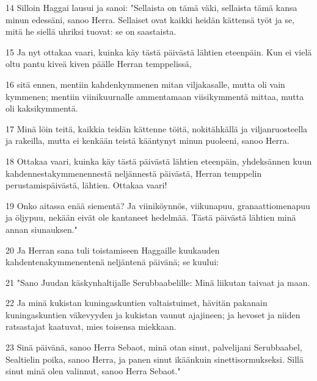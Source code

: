 \par 14 Silloin Haggai lausui ja sanoi: "Sellaista on tämä väki, sellaista tämä kansa minun edessäni, sanoo Herra. Sellaiset ovat kaikki heidän kättensä työt ja se, mitä he siellä uhriksi tuovat: se on saastaista.
\par 15 Ja nyt ottakaa vaari, kuinka käy tästä päivästä lähtien eteenpäin. Kun ei vielä oltu pantu kiveä kiven päälle Herran temppelissä,
\par 16 sitä ennen, mentiin kahdenkymmenen mitan viljakasalle, mutta oli vain kymmenen; mentiin viinikuurnalle ammentamaan viisikymmentä mittaa, mutta oli kaksikymmentä.
\par 17 Minä löin teitä, kaikkia teidän kättenne töitä, nokitähkällä ja viljanruosteella ja rakeilla, mutta ei kenkään teistä kääntynyt minun puoleeni, sanoo Herra.
\par 18 Ottakaa vaari, kuinka käy tästä päivästä lähtien eteenpäin, yhdeksännen kuun kahdennestakymmenennestä neljännestä päivästä, Herran temppelin perustamispäivästä, lähtien. Ottakaa vaari!
\par 19 Onko aitassa enää siementä? Ja viiniköynnös, viikunapuu, granaattiomenapuu ja öljypuu, nekään eivät ole kantaneet hedelmää. Tästä päivästä lähtien minä annan siunauksen."
\par 20 Ja Herran sana tuli toistamiseen Haggaille kuukauden kahdentenakymmenentenä neljäntenä päivänä; se kuului:
\par 21 "Sano Juudan käskynhaltijalle Serubbaabelille: Minä liikutan taivaat ja maan.
\par 22 Ja minä kukistan kuningaskuntien valtaistuimet, hävitän pakanain kuningaskuntien väkevyyden ja kukistan vaunut ajajineen; ja hevoset ja niiden ratsastajat kaatuvat, mies toisensa miekkaan.
\par 23 Sinä päivänä, sanoo Herra Sebaot, minä otan sinut, palvelijani Serubbaabel, Sealtielin poika, sanoo Herra, ja panen sinut ikäänkuin sinettisormukseksi. Sillä sinut minä olen valinnut, sanoo Herra Sebaot."


